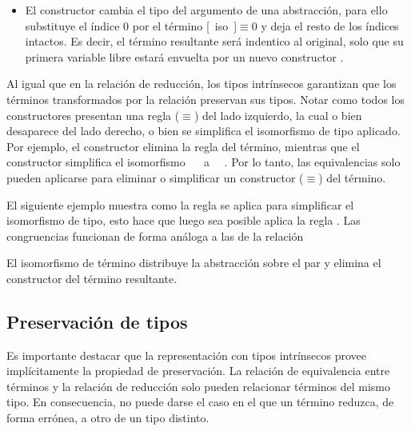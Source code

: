 \begin{itemize}
	\item El constructor  cambia el tipo del argumento de una abstracción, para ello substituye el índice 0 por el término [~iso~]$\equiv0$ y deja el resto de los índices intactos.
	Es decir, el término resultante será indentico al original, solo que su primera variable libre estará envuelta por un nuevo constructor \const{[\_]$\equiv$\_}.
\end{itemize}

Al igual que en la relación de reducción, los tipos intrínsecos garantizan que los términos transformados por la relación \type{$\_\rightleftarrows\_$} preservan sus tipos.
Notar como todos los constructores presentan una regla ($\equiv$) del lado izquierdo, la cual o bien desaparece del lado derecho, o bien se simplifica el isomorfismo de tipo aplicado.
Por ejemplo, el constructor  elimina la regla \const{[ comm ]$\equiv$\_} del término, mientras que el constructor  simplifica el isomorfismo \const{[ cong$\Rightarrow_2$}~~\const{]$\equiv$\_} a \const{[}~~\const{]$\equiv$\_}.
Por lo tanto, las equivalencias solo pueden aplicarse para eliminar o simplificar un constructor ($\equiv$) del término.

\begin{example}
	El siguiente ejemplo muestra como la regla  se aplica para simplificar el isomorfismo de tipo, esto hace que luego sea posible aplica la regla .
	Las congruencias funcionan de forma análoga a las de la relación \type{$\_\hookrightarrow\_$}
\end{example}

\begin{example}
	El isomorfismo de término  distribuye la abstracción sobre el par y elimina el constructor  del término resultante.
\end{example}

\subsection{Preservación de tipos}

Es importante destacar que la representación con tipos intrínsecos provee implícitamente la propiedad de preservación.
La relación de equivalencia entre términos \type{$\_\rightleftarrows\_$} y la relación de reducción \type{$\_\hookrightarrow\_$} solo pueden relacionar términos del mismo tipo. 
En consecuencia, no puede darse el caso en el que un término reduzca, de forma errónea, a otro de un tipo distinto.


